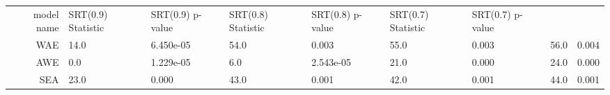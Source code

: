 \begin{tabular}{|r|l|l|l|l|l|l|}
  \hline
  model name & SRT(0.9) Statistic & SRT(0.9) p-value & SRT(0.8) Statistic & SRT(0.8) p-value & SRT(0.7) Statistic & SRT(0.7) p-value \\ 
  WAE & 14.0 & 6.450e-05 & 54.0 & 0.003 & 55.0 & 0.003 & 56.0 & 0.004 \\ 
  AWE & 0.0 & 1.229e-05 & 6.0 & 2.543e-05 & 21.0 & 0.000 & 24.0 & 0.000 \\ 
  SEA & 23.0 & 0.000 & 43.0 & 0.001 & 42.0 & 0.001 & 44.0 & 0.001 \\ 
\end{tabular}
